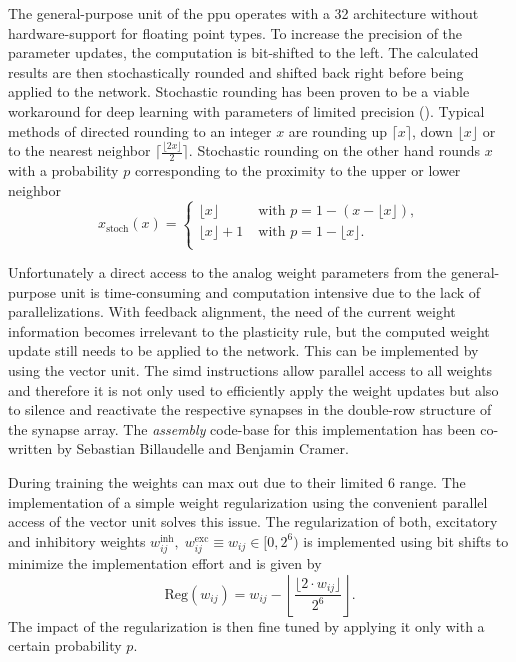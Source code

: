 The general-purpose unit of the \gls{ppu} operates with a \SI{32}{\bit} architecture without hardware-support for floating point types. To increase the precision of the parameter updates, the computation is bit-shifted to the left. The calculated results are then stochastically rounded and shifted back right before being applied to the network. Stochastic rounding has been proven to be a viable workaround for deep learning with parameters of limited precision (\citealp{limitedprecisionpaper}). Typical methods of directed rounding to an integer $x$ are rounding up $\lceil x\rceil$, down $\lfloor x\rfloor$ or to the nearest neighbor $\lceil\frac{\lfloor2x\rfloor}{2}\rceil$. Stochastic rounding on the other hand rounds $x$ with a probability $p$ corresponding to the proximity to the upper or lower neighbor
\begin{equation*}
x_\text{stoch}(x) = 
\begin{cases}
\lfloor x \rfloor \quad \quad &\text{with } p = 1 - (x - \lfloor x \rfloor), \\
\lfloor x \rfloor + 1 &\text{with } p = 1 - \lfloor x \rfloor. \\
\end{cases}
\end{equation*}

Unfortunately a direct access to the analog weight parameters from the general-purpose unit is time-consuming and computation intensive due to the lack of parallelizations. With feedback alignment, the need of the current weight information becomes irrelevant to the plasticity rule, but the computed weight update still needs to be applied to the network. This can be implemented by using the vector unit. The \gls{simd} instructions allow parallel access to all weights and therefore it is not only used to efficiently apply the weight updates but also to silence and reactivate the respective synapses in the double-row structure of the synapse array. The \emph{assembly} code-base for this implementation has been co-written by Sebastian Billaudelle and Benjamin Cramer.

During training the weights can max out due to their limited \SI{6}{\bit} range. The implementation of a simple weight regularization using the convenient parallel access of the vector unit solves this issue. The regularization of both, excitatory and inhibitory weights $w_{ij}^\text{inh},\; w_{ij}^\text{exc}\equiv w_{ij} \in [0,2^6)$ is implemented using bit shifts to minimize the implementation effort and is given by
\begin{equation*}
\text{Reg}(w_{ij}) = w_{ij} - \left\lfloor \frac{\lfloor 2 \cdot w_{ij}  \rfloor}{2^{6}} \right\rfloor.					
\end{equation*}
The impact of the regularization is then fine tuned by applying it only with a certain probability $p$.

